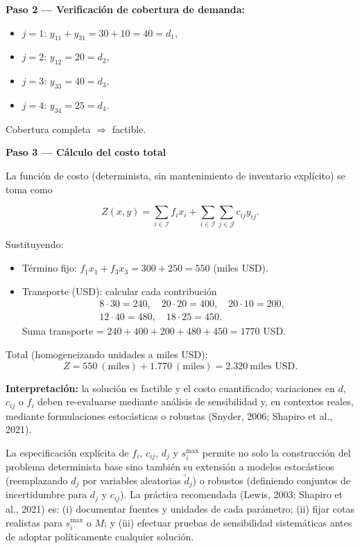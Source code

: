 \documentclass[
  spanish,
  letterpaper,
  DIV=11,
  numbers=noendperiod]{scrartcl}
\providecommand{\tightlist}{%
  \setlength{\itemsep}{0pt}\setlength{\parskip}{0pt}}
\begin{document}
\textbf{Paso 2 --- Verificación de cobertura de demanda:}

\begin{itemize}
\tightlist
\item
  \(j=1\): \(y_{11}+y_{31}=30+10=40 = d_1\),
\item
  \(j=2\): \(y_{12}=20 = d_2\),
\item
  \(j=3\): \(y_{33}=40 = d_3\),
\item
  \(j=4\): \(y_{34}=25 = d_4\).
\end{itemize}

Cobertura completa \(\Rightarrow\) factible.

\textbf{Paso 3 --- Cálculo del costo total}

La función de costo (determinista, sin mantenimiento de inventario
explícito) se toma como

\[
Z(x,y)=\sum_{i\in\mathcal{I}} f_i x_i + \sum_{i\in\mathcal{I}}\sum_{j\in\mathcal{J}} c_{ij} y_{ij}.
\]

Sustituyendo:

\begin{itemize}
\tightlist
\item
  Término fijo: \(f_1 x_1 + f_3 x_3 = 300 + 250 = 550\) (miles USD).
\item
  Transporte (USD): calcular cada contribución \[
  \begin{aligned}
  &8\cdot 30 = 240,\quad 20\cdot 20 = 400,\quad 20\cdot 10 = 200,\\
  &12\cdot 40 = 480,\quad 18\cdot 25 = 450.
  \end{aligned}
  \] Suma transporte = \(240+400+200+480+450 = 1770\) USD.
\end{itemize}

Total (homogeneizando unidades a miles USD): \[
Z = 550\ (\text{miles}) + 1.770\ (\text{miles}) = 2.320\ \text{miles USD}.
\]

\textbf{Interpretación:} la solución es factible y el costo
cuantificado; variaciones en \(d\), \(c_{ij}\) o \(f_i\) deben
re-evaluarse mediante análisis de sensibilidad y, en contextos reales,
mediante formulaciones estocásticas o robustas (Snyder, 2006; Shapiro et
al., 2021).

La especificación explícita de \(f_i\), \(c_{ij}\), \(d_j\) y
\(s_i^{\max}\) permite no solo la construcción del problema determinista
base sino también su extensión a modelos estocásticos (reemplazando
\(d_j\) por variables aleatorias \(\tilde d_j\)) o robustos (definiendo
conjuntos de incertidumbre para \(d_j\) y \(c_{ij}\)). La práctica
recomendada (Lewis, 2003; Shapiro et al., 2021) es: (i) documentar
fuentes y unidades de cada parámetro; (ii) fijar cotas realistas para
\(s_i^{\max}\) o \(M\); y (iii) efectuar pruebas de sensibilidad
sistemáticas antes de adoptar políticamente cualquier solución.
\end{document}
